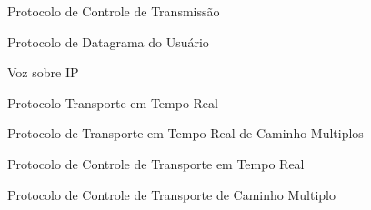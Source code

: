 \documentclass[
	12pt,				%
	openright,			%
	oneside,			%
	a4paper,			%
	chapter=TITLE,		%
	english,			%
	brazil,				%
	]{abntex2}
\renewcommand{\ABNTEXchapterfont}{\normalfont}
\begin{document}
\begin{siglas}
\ABNTEXchapterfont\item[TCP] Protocolo de Controle de Transmissão
\item[UDP] Protocolo de Datagrama do Usuário 
\item[VoIP] Voz sobre IP 
\item[RTP] Protocolo Transporte em Tempo Real
\item[MPRTP] Protocolo de Transporte em Tempo Real de Caminho Multiplos \item[RTCP] Protocolo de Controle de Transporte em Tempo Real
\item[MPTCP] Protocolo de Controle de Transporte de Caminho Multiplo 
\end{siglas}
\tableofcontents*
\cleardoublepage
\textual










\printindex
\end{document}
